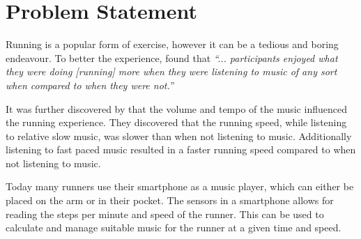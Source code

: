 \section{Problem Statement}
Running is a popular form of exercise, however it can be a tedious and boring endeavour.
To better the experience, \citep{musicRunEffectArticle} found that 
\textit{``... participants enjoyed what they were doing [running] more when they were listening to music of any sort when compared to when they were not.''}

It was further discovered by \citep{musicRunEffectArticle} that the volume and tempo of the music influenced the running experience.
They discovered that the running speed, while listening to relative slow music, was slower than when not listening to music. Additionally listening to fast paced music resulted in a faster running speed compared to when not listening to music.

Today many runners use their smartphone as a music player, which can either be placed on the arm or in their pocket.
The sensors in a smartphone allows for reading the steps per minute and speed of the runner. This can be used to calculate and manage suitable music for the runner at a given time and speed.



